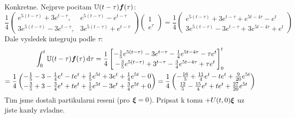 Konkretne. Nejprve pocitam ${\mathbb{U}}(t-\tau)\mathbf{\boldsymbol{f}}(\tau)$:
\[
  \frac14
  \begin{pmatrix}
     e^{5(t-\tau)}+3e^{t-\tau},&e^{5(t-\tau)}-e^{t-\tau}\\
     3e^{5(t-\tau)}-3e^{t-\tau},&3e^{5(t-\tau)}+e^{t-\tau}
   \end{pmatrix}
   \begin{pmatrix}
     1\\e^\tau
   \end{pmatrix}=
   \frac14
   \begin{pmatrix}
     e^{5(t-\tau)}+3e^{t-\tau}+e^{5t-4\tau}-e^t\\
     3e^{5(t-\tau)}-3e^{t-\tau}+3e^{5t-4\tau}+e^t
   \end{pmatrix}
\]
Dale vysledek integruju podle $\tau$:
\begin{multline*}
  \int_0^t {\mathbb{U}}(t-\tau) \mathbf{\boldsymbol{f}}(\tau)\,{\rm d}\tau=
  \frac14
  \begin{bmatrix}
     -\frac15e^{5(t-\tau)}-3e^{t-\tau}-\frac14e^{5t-4\tau}-\tau e^t\\[0.5ex]
     -\frac35e^{5(t-\tau)}+3^{t-\tau}-\frac34e^{5t-4\tau}+\tau e^t
  \end{bmatrix}_0^t\\
  =\frac14
  \begin{pmatrix}
    -\frac15-3-\frac14e^t-te^t+\frac15e^{5t}+3e^t+\frac14e^{5t}-0\\[0.5ex]
    -\frac35+3-\frac34e^t+te^t+\frac15e^{5t}-3e^t+\frac34e^{5t}+0
  \end{pmatrix}
  =\frac14
  \begin{pmatrix}
    -\frac{16}{5}+\frac{11}{4}e^t-te^t+\frac{9}{20}e^{5t}\\[0.5ex]
    \frac{12}{5}-\frac{15}{4}e^t+te^t+\frac{27}{20}e^{5t}
  \end{pmatrix}
\end{multline*}
Tim jsme dostali partikularni reseni (pro $\mathbf{\boldsymbol{\xi}}=0$).
Pripsat k tomu $+U(t,0)\mathbf{\boldsymbol{\xi}}$ uz jiste kazdy zvladne.

